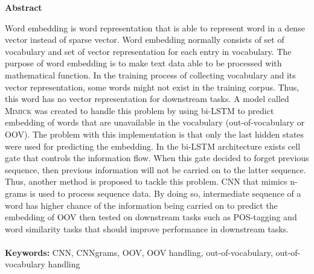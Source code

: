 \documentclass[a4paper,12pt]{report}
\newcommand{\linespacing}{1.5}
\renewcommand{\baselinestretch}{\linespacing}
\begin{document}





\newpage
{}
\tableofcontents

\newpage
\pagebreak
\hspace{0pt}
\vfill
\begin{center}
	\textbf{Abstract}
\end{center}
\par Word embedding is word representation that is able to represent
word in a dense vector instead of sparse vector. Word embedding
normally consists of set of vocabulary and set of vector
representation for each entry in vocabulary. The purpose of word
embedding is to make text data able to be processed with mathematical
function. In the training process of collecting vocabulary and its
vector representation, some words might not exist in the training
corpus. Thus, this word has no vector representation for downstream
tasks. A model called \textsc{Mimick} was created to handle this
problem by using bi-LSTM to predict embedding of words that are
unavailable in the vocabulary (out-of-vocabulary or OOV). The problem
with this implementation is that only the last hidden states were used
for predicting the embedding. In the bi-LSTM architecture exists cell
gate that controls the information flow. When this gate decided to
forget previous sequence, then previous information will not be
carried on to the latter sequence. Thus, another method is proposed to
tackle this problem. CNN that mimics n-grams is used to process
sequence data. By doing so, intermediate sequence of a word has higher
chance of the information being carried on to predict the embedding of
OOV then tested on downstream tasks such as POS-tagging and word
similarity tasks that should improve performance in downstream tasks.
\\~\\
\textbf{Keywords:} CNN, CNNgrams, OOV, OOV handling,
out-of-vocabulary, out-of-vocabulary handling
\vfill
\hspace{0pt}
\pagebreak
\end{document}
